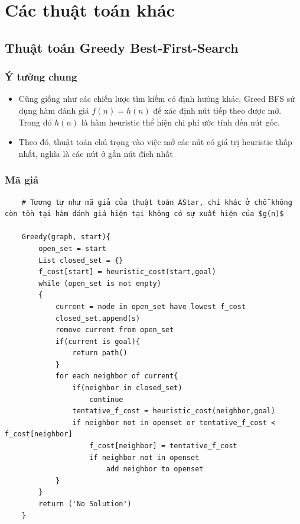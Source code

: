 \documentclass{article}
\begin{document}
\section{Các thuật toán khác}

\subsection{Thuật toán Greedy Best-First-Search}
\subsubsection{Ý tưởng chung}
\begin{itemize}
    \item Cũng giống như các chiến lược tìm kiếm có định hướng khác, Greed BFS sử dụng hàm đánh giá $f(n) = h(n)$ để xác định nút tiếp theo được mở. Trong đó $h(n)$ là hàm heuristic thể hiện chi phí ước tính đến nút gốc.
    \item Theo đó, thuật toán chú trọng vào việc mở các nút có giá trị heuristic thấp nhất, nghĩa là các nút ở gần nút đích  nhất
\end{itemize}

\subsubsection{Mã giả}

\begin{verbatim}
    # Tương tự như mã giả của thuật toán AStar, chí khác ở chỗ không còn tồn tại hàm đánh giá hiện tại không có sự xuất hiện của $g(n)$
    
    Greedy(graph, start){
        open_set = start 
        List closed_set = {}
        f_cost[start] = heuristic_cost(start,goal)
        while (open_set is not empty)
        {
            current = node in open_set have lowest f_cost
            closed_set.append(s)  
            remove current from open_set
            if(current is goal){
                return path()
            }
            for each neighbor of current{
                if(neighbor in closed_set)
                    continue
                tentative_f_cost = heuristic_cost(neighbor,goal)
                if neighbor not in openset or tentative_f_cost < f_cost[neighbor]
                    f_cost[neighbor] = tentative_f_cost
                    if neighbor not in openset
                        add neighbor to openset 
            }
        } 
        return ('No Solution')
    }
\end{verbatim}
\end{document}
